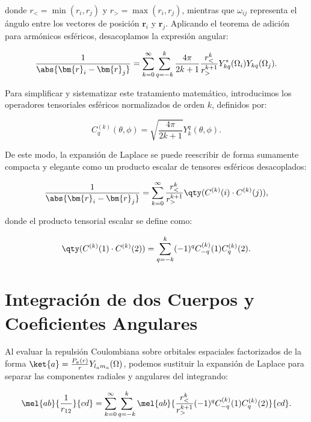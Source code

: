 donde \( r_{<} = \min(r_i, r_j) \) y \( r_{>} = \max(r_i, r_j) \), mientras que \( \omega_{ij} \) representa el ángulo entre los vectores de posición \( \bm{r}_i \) y \( \bm{r}_j \). Aplicando el teorema de adición para armónicos esféricos, desacoplamos la expresión angular:

\begin{equation}
  \label{eq:laplace-harm}
  \frac{1}{\abs{\bm{r}_i-\bm{r}_j}} = \sum_{k=0}^{\infty} \sum_{q=-k}^k \frac{4\pi}{2k+1} \frac{r_{<}^k}{r_{>}^{k+1}} Y_{kq}^{*}(\Omega_i) Y_{kq}(\Omega_j).
\end{equation}

Para simplificar y sistematizar este tratamiento matemático, introducimos los operadores tensoriales esféricos normalizados de orden \( k \), definidos por:

\begin{equation}
  C_q^{(k)}(\theta, \phi) = \sqrt{\frac{4\pi}{2k+1}} Y_k^q(\theta, \phi).
\end{equation}

De este modo, la expansión de Laplace se puede reescribir de forma sumamente compacta y elegante como un producto escalar de tensores esféricos desacoplados:

\begin{equation}
  \frac{1}{\abs{\bm{r}_i-\bm{r}_j}} = \sum_{k=0}^{\infty} \frac{r_{<}^k}{r_{>}^{k+1}} \qty( C^{(k)}(i) \cdot C^{(k)}(j) ),
\end{equation}

donde el producto tensorial escalar se define como:

\begin{equation}
  \qty( C^{(k)}(1) \cdot C^{(k)}(2) ) = \sum_{q=-k}^k (-1)^q C_{-q}^{(k)}(1) C_q^{(k)}(2).
\end{equation}

\section{Integración de dos Cuerpos y Coeficientes Angulares}

Al evaluar la repulsión Coulombiana sobre orbitales espaciales factorizados de la forma \( \ket{a} = \frac{P_a(r)}{r} Y_{l_a m_a}(\Omega) \), podemos sustituir la expansión de Laplace para separar las componentes radiales y angulares del integrando:

\begin{equation}
  \mel{ab}{\frac{1}{r_{12}}}{cd} = \sum_{k=0}^{\infty} \sum_{q=-k}^k \mel{ab}{\frac{r_{<}^k}{r_{>}^{k+1}} (-1)^q C_{-q}^{(k)}(1) C_q^{(k)}(2)}{cd}.
\end{equation}

